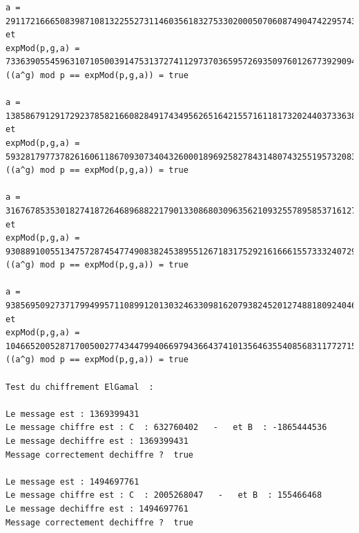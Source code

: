 \documentclass[a4paper,11pt]{article}
\begin{document}
\begin{lstlisting}[caption ={le fichier test.txt}, captionpos=b,breaklines = true]
a = 2911721666508398710813225527311460356183275330200050706087490474229574356125601400286433689673648976682113519076116546990728567892911883730744836032866 et 
expMod(p,g,a) = 73363905545963107105003914753137274112973703659572693509760126773929094935829844726380238281309093186530128669524067723077801951294461794049554075950009525304224319047472103659964426734266884061857161595588354592776562499677063617200394774225886152922377012465339466363483488318418547461683462497070894366101
((a^g) mod p == expMod(p,g,a)) = true

a = 1385867912917292378582166082849174349562651642155716118173202440373363861834715048644196362636512435026694885936387442775085533955328675609162204638091 et 
expMod(p,g,a) = 59328179773782616061186709307340432600018969258278431480743255195732083346551391937584013989281787463633901874559741613021040096364124638994971632166408018359763218838571614139471612766920015049473941344039841499866235048814837671047879308346055141504993001414723084122012375505807920661433787716644657865145
((a^g) mod p == expMod(p,g,a)) = true

a = 3167678535301827418726468968822179013308680309635621093255789585371612781800649808464681152436007193128560042258983280356380582726410433892505442024172 et 
expMod(p,g,a) =  930889100551347572874547749083824538955126718317529216166615573332407299851481317412237094553042091849307227958113785550841195418634796980342523218043450354363610870550569321204965803046664052672475725160133953285904836428848177235627356724923320246192114030704715299649783615689390617958520014360354647413029
((a^g) mod p == expMod(p,g,a)) = true

a = 938569509273717994995711089912013032463309816207938245201274881809240462573981385057786855289849220819239038496022570535568318507009044288207030960259 et 
expMod(p,g,a) = 104665200528717005002774344799406697943664374101356463554085683117727154593081190744287800232340006945520367867992206439367910996834876882647232338414623590799173727253560108797757444763182337597920851105415078636410027809744672628114167544904014901912495642473794568658613636266577408682137832526948063896653
((a^g) mod p == expMod(p,g,a)) = true

Test du chiffrement ElGamal  : 

Le message est : 1369399431
Le message chiffre est : C  : 632760402   -   et B  : -1865444536
Le message dechiffre est : 1369399431
Message correctement dechiffre ?  true

Le message est : 1494697761
Le message chiffre est : C  : 2005268047   -   et B  : 155466468
Le message dechiffre est : 1494697761
Message correctement dechiffre ?  true


\end{lstlisting}
\end{document}
